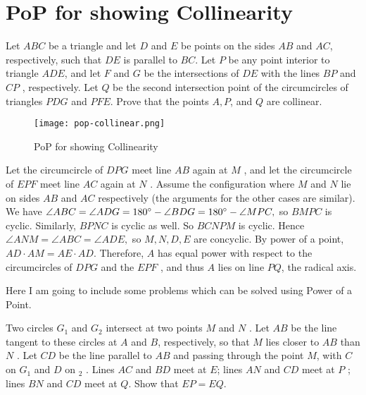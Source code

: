 \section{PoP for showing Collinearity}

\begin{example}
Let $ABC$ be a triangle and let $D$ and $E$ be points on the sides $AB$ and $AC$, respectively,
such that $DE$ is parallel to $BC$. Let $P$ be any point interior to triangle $ADE$, and let $F$
and $G$ be the intersections of $DE$ with the lines $BP$ and $CP$ , respectively. Let $Q$ be the
second intersection point of the circumcircles of triangles $PDG$ and $PFE$. Prove that the
points $A, P$, and $Q$ are collinear.
\end{example}

\begin{figure}[ht]
\centering
	\texttt{[image: pop-collinear.png]}
	\caption{PoP for showing Collinearity}
\end{figure}

\begin{soln}
Let the circumcircle of $DPG$ meet line $AB$ again at $M$ , and let the circumcircle of $EPF$
meet line $AC$ again at $N$ . Assume the configuration where $M$ and $N$ lie on sides $AB$
and $AC$ respectively (the arguments for the other cases are similar). We have $\angle  ABC =
\angle  ADG = 180 ^\circ - \angle  BDG = 180 ^\circ - \angle M P C,$ so $BMPC$ is cyclic. Similarly, $BPNC$ is
cyclic as well. So $BCNPM$ is cyclic. Hence $\angle AN M = \angle ABC = \angle ADE,$ so $M, N, D, E$
are concyclic. By power of a point, $AD \cdot AM = AE \cdot AD$. Therefore, $A$ has equal power
with respect to the circumcircles of $DPG$ and the $EPF$ , and thus $A$ lies on line $PQ$, the radical axis.

\end{soln}

Here I am going to include some problems which can be solved using Power of a Point.
\begin{problem}[IMO 2000/1]
Two circles $G_1$ and $G_2$ intersect at two points $M$ and $N$ . Let
$AB$ be the line tangent to these circles at $A$ and $B$, respectively, so that $M$ lies closer to $AB$
than $N$ . Let $CD$ be the line parallel to $AB$ and passing through the point $M$, with $C$ on $G_1$
and $D$ on $_2$ . Lines $AC$ and $BD$ meet at $E$; lines $AN$ and $CD$ meet at $P$ ; lines $BN$ and
$CD$ meet at $Q$. Show that $EP = EQ$.
	\begin{hint}
		\addhint{}
		\addhint{}	
	\end{hint}
\end{problem}

